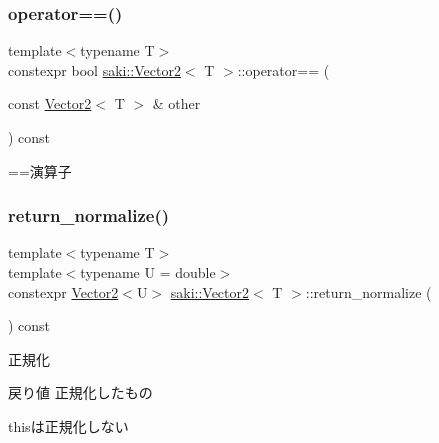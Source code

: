 \mbox{\label{classsaki_1_1_vector2_a72b70031ffca3596e8df06cc4e84dc51}} 
\subsubsection{\texorpdfstring{operator==()}{operator==()}}
{\footnotesize\ttfamily template$<$typename T$>$ \\
constexpr bool \mbox{\hyperlink{classsaki_1_1_vector2}{saki\+::\+Vector2}}$<$ T $>$\+::operator== (\begin{DoxyParamCaption}\item[{const \mbox{\hyperlink{classsaki_1_1_vector2}{Vector2}}$<$ T $>$ \&}]{other }\end{DoxyParamCaption}) const\hspace{0.3cm}{\ttfamily [inline]}}



==演算子 

\mbox{\label{classsaki_1_1_vector2_ad4fe2f7cb118bfad82333017c15c591a}} 
\subsubsection{\texorpdfstring{return\+\_\+normalize()}{return\_normalize()}}
{\footnotesize\ttfamily template$<$typename T$>$ \\
template$<$typename U  = double$>$ \\
constexpr \mbox{\hyperlink{classsaki_1_1_vector2}{Vector2}}$<$U$>$ \mbox{\hyperlink{classsaki_1_1_vector2}{saki\+::\+Vector2}}$<$ T $>$\+::return\+\_\+normalize (\begin{DoxyParamCaption}{ }\end{DoxyParamCaption}) const\hspace{0.3cm}{\ttfamily [inline]}}



正規化 

\begin{DoxyReturn}{戻り値}
正規化したもの
\end{DoxyReturn}
thisは正規化しない \mbox{\label{classsaki_1_1_vector2_a74ffa40e66a47ea296ba51dbb815be17}} 
